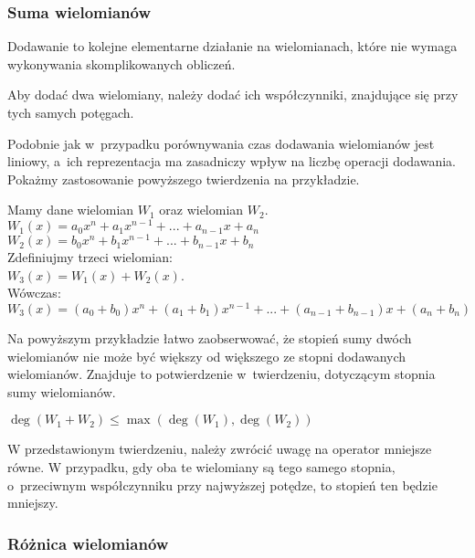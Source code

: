 \subsubsection{Suma wielomianów}

Dodawanie to kolejne elementarne działanie na wielomianach, które nie wymaga wykonywania skomplikowanych obliczeń.

\begin{theorem}
	$ $\\
	Aby dodać dwa wielomiany, należy dodać ich współczynniki, znajdujące się przy tych samych potęgach.
\end{theorem}

Podobnie jak w~przypadku porównywania czas dodawania wielomianów jest liniowy, a~ich reprezentacja ma zasadniczy wpływ na liczbę operacji dodawania. Pokażmy zastosowanie powyższego twierdzenia na przykładzie.

\begin{example}
	$ $\\
	Mamy dane wielomian $W_1$ oraz wielomian $W_2$. \\
	$W_1(x) = a_0x^n + a_1x^{n-1} + ... + a_{n-1}x + a_n$ \\
	$W_2(x) = b_0x^n + b_1x^{n-1} + ... + b_{n-1}x + b_n$ \\
	Zdefiniujmy trzeci wielomian: \\
	$W_3(x) = W_1(x) + W_2(x)$. \\
	Wówczas: \\
	$W_3(x) = (a_0+b_0)x^n + (a_1+b_1)x^{n-1} + ... + (a_{n-1} + b_{n-1})x + (a_n + b_n)$
\end{example}

Na powyższym przykładzie łatwo zaobserwować, że stopień sumy dwóch wielomianów nie może być większy od większego ze stopni dodawanych wielomianów. Znajduje to potwierdzenie w~twierdzeniu, dotyczącym stopnia sumy wielomianów.

\begin{theorem}
	$ $\\
	$\deg(W_1 + W_2) \le \max(\deg(W_1),\deg (W_2))$
\end{theorem}

W przedstawionym twierdzeniu, należy zwrócić uwagę na operator mniejsze równe. W przypadku, gdy oba te wielomiany są tego samego stopnia, o~przeciwnym współczynniku przy najwyższej potędze, to stopień ten będzie mniejszy.

\subsubsection{Różnica wielomianów}

